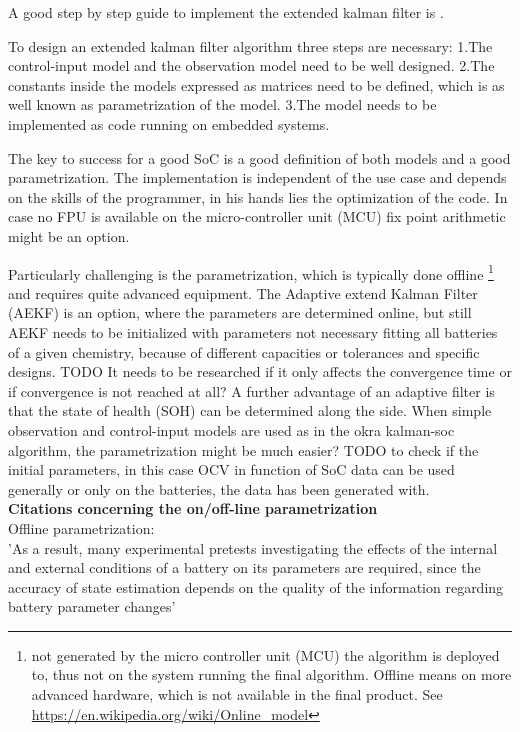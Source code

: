 A good step by step guide to implement the extended kalman filter is \cite{rzepka2021implementing}.

To design an extended kalman filter algorithm three steps are necessary:
1.The control-input model and the observation model need to be well designed. 
2.The constants inside the models expressed as matrices need to be defined, which is as well known as parametrization of the model.  
3.The model needs to be implemented as code running on embedded systems. 

The key to success for a good SoC is a good definition of both models and a good parametrization. The implementation is independent of the use case and depends on the skills of the programmer, in his  hands lies the optimization of the  code. In case no FPU is available on the micro-controller unit (MCU) fix point arithmetic might be an option.  

Particularly challenging is the parametrization, which is typically done offline \footnote{not generated by the micro controller unit (MCU) the algorithm is deployed to, thus not on the system running the final algorithm. Offline means on more advanced hardware, which is not available in the final product. See \url{https://en.wikipedia.org/wiki/Online_model} } and requires quite advanced equipment. The Adaptive extend Kalman Filter (AEKF) is an option, where the parameters are determined online, but still AEKF needs to be initialized with parameters not necessary fitting all batteries of a given chemistry, because of different capacities or tolerances and specific designs. 
TODO It needs to be researched if it only affects the convergence time or if convergence is not reached at all? A further advantage of an adaptive filter is that the state of health (SOH) can be determined along the side. 
When simple observation and control-input models are used as in the okra kalman-soc algorithm, the parametrization might be much easier?
TODO to check if the initial parameters, in this case OCV in function of SoC data can be used generally or only on the batteries, the data has been generated with. \\

\textbf{Citations concerning the on/off-line parametrization} \\

Offline parametrization: \\
'As a result, many experimental pretests investigating the
effects of the internal and external conditions of a battery on its parameters are required, since the
accuracy of state estimation depends on the quality of the information regarding battery parameter
changes'

